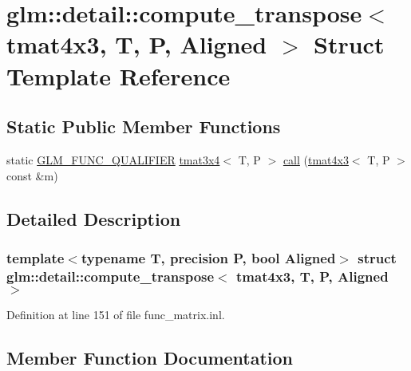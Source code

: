 \hypertarget{structglm_1_1detail_1_1compute__transpose_3_01tmat4x3_00_01_t_00_01_p_00_01_aligned_01_4}{}\section{glm\+::detail\+::compute\+\_\+transpose$<$ tmat4x3, T, P, Aligned $>$ Struct Template Reference}
\label{structglm_1_1detail_1_1compute__transpose_3_01tmat4x3_00_01_t_00_01_p_00_01_aligned_01_4}
\subsection*{Static Public Member Functions}
\begin{DoxyCompactItemize}
\item 
static \mbox{\hyperlink{setup_8hpp_a33fdea6f91c5f834105f7415e2a64407}{G\+L\+M\+\_\+\+F\+U\+N\+C\+\_\+\+Q\+U\+A\+L\+I\+F\+I\+ER}} \mbox{\hyperlink{structglm_1_1tmat3x4}{tmat3x4}}$<$ T, P $>$ \mbox{\hyperlink{structglm_1_1detail_1_1compute__transpose_3_01tmat4x3_00_01_t_00_01_p_00_01_aligned_01_4_a1678412b806ed8c3bce9b305982b6726}{call}} (\mbox{\hyperlink{structglm_1_1tmat4x3}{tmat4x3}}$<$ T, P $>$ const \&m)
\end{DoxyCompactItemize}


\subsection{Detailed Description}
\subsubsection*{template$<$typename T, precision P, bool Aligned$>$\newline
struct glm\+::detail\+::compute\+\_\+transpose$<$ tmat4x3, T, P, Aligned $>$}



Definition at line 151 of file func\+\_\+matrix.\+inl.



\subsection{Member Function Documentation}
\mbox{\label{structglm_1_1detail_1_1compute__transpose_3_01tmat4x3_00_01_t_00_01_p_00_01_aligned_01_4_a1678412b806ed8c3bce9b305982b6726}} 
